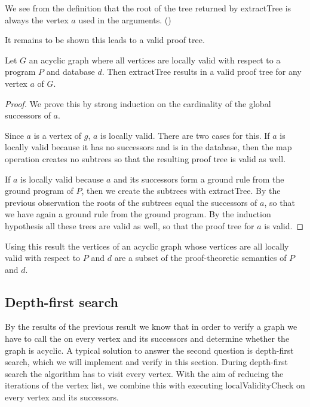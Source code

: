 We see from the definition that the root of the tree returned by extractTree is always the vertex $a$ used in the arguments. (\rootOfExtractTree)

It remains to be shown this leads to a valid proof tree.

\begin{lemma}[\extractTreeStepValidProofTreeIffAllLocallyValidAndAcyclic]
    Let $G$ an acyclic graph where all vertices are locally valid with respect to a program $P$ and database $d$. Then extractTree results in a valid proof tree for any vertex $a$ of $G$.
\end{lemma}
\begin{proof}
    We prove this by strong induction on the cardinality of the global successors of $a$.

    Since $a$ is a vertex of $g$, $a$ is locally valid. There are two cases for this. If $a$ is locally valid because it has no successors and is in the database, then the map operation creates no subtrees so that the resulting proof tree is valid as well.

    If $a$ is locally valid because $a$ and its successors form a ground rule from the ground program of $P$, then we create the subtrees with extractTree. By the previous observation the roots of the subtrees equal the successors of $a$, so that we have again a ground rule from the ground program. By the induction hypothesis all these trees are valid as well, so that the proof tree for $a$ is valid.
\end{proof}

Using this result the vertices of an acyclic graph whose vertices are all locally valid with respect to $P$ and $d$ are a subset of the proof-theoretic semantics of $P$ and $d$.

\subsection{Depth-first search}

By the results of the previous result we know that in order to verify a graph we have to call the \localValidityCheck on every vertex and its successors and determine whether the graph is acyclic. A typical solution to answer the second question is depth-first search, which we will implement and verify in this section. During depth-first search the algorithm has to visit every vertex. With the aim of reducing the iterations of the vertex list, we combine this with executing localValidityCheck on every vertex and its successors.

